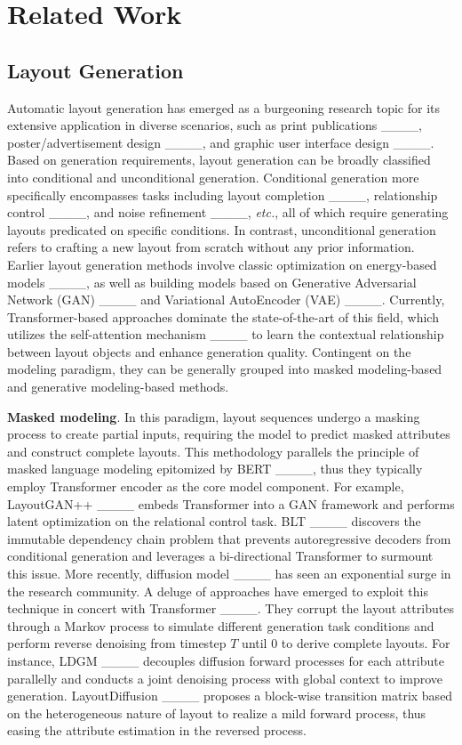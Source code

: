 \section{Related Work}
\label{sec::related}
\subsection{Layout Generation}
Automatic layout generation has emerged as a burgeoning research topic for its extensive application in diverse scenarios, such as print publications ____, poster/advertisement design ____, and graphic user interface design ____. Based on generation requirements, layout generation can be broadly classified into conditional and unconditional generation. Conditional generation more specifically encompasses tasks including layout completion ____, relationship control ____, and noise refinement ____, \emph{etc.}, all of which require generating layouts predicated on specific conditions. In contrast, unconditional generation refers to crafting a new layout from scratch without any prior information. Earlier layout generation methods involve classic optimization on energy-based models ____, as well as building models based on Generative Adversarial Network (GAN) ____ and Variational AutoEncoder (VAE) ____. Currently, Transformer-based approaches dominate the state-of-the-art of this field, which utilizes the self-attention mechanism ____ to learn the contextual relationship between layout objects and enhance generation quality. Contingent on the modeling paradigm, they can be generally grouped into masked modeling-based and generative modeling-based methods.

\textbf{Masked modeling}. In this paradigm, layout sequences undergo a masking process to create partial inputs, requiring the model to predict masked attributes and construct complete layouts. This methodology parallels the principle of masked language modeling epitomized by BERT ____, thus they typically employ Transformer encoder as the core model component. For example, LayoutGAN++ ____ embeds Transformer into a GAN framework and performs latent optimization on the relational control task. BLT ____ discovers the immutable dependency chain problem that prevents autoregressive decoders from conditional generation and leverages a bi-directional Transformer to surmount this issue. More recently, diffusion model ____ has seen an exponential surge in the research community. A deluge of approaches have emerged to exploit this technique in concert with Transformer ____. They corrupt the layout attributes through a Markov process to simulate different generation task conditions and perform reverse denoising from timestep $T$ until 0 to derive complete layouts. For instance, LDGM ____ decouples diffusion forward processes for each attribute parallelly and conducts a joint denoising process with global context to improve generation. LayoutDiffusion ____ proposes a block-wise transition matrix based on the heterogeneous nature of layout to realize a mild forward process, thus easing the attribute estimation in the reversed process.

